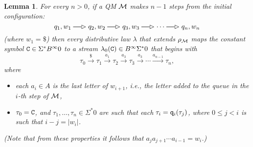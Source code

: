 \documentclass[adraft,copyright,creativecommons]{eptcs}
\newtheorem{lemma}[theorem]{Lemma}
\newcommand{\Bb}{B^{\infty}}
\newcommand{\Ss}{\Sigma^*}
\newcommand{\goes}[1]{\stackrel{#1}{\longrightarrow}}
\newcommand{\abstractgoes}[2]{\setbox0=\hbox{\ ${\scriptstyle#2}$\ }
\ifdim\wd0<12pt\wd0=12pt\fi
\mathrel{\stackrel{#2}{\rule[2.2pt]{\wd0}{0.6pt}}\mkern-6mu{#1}}}
\newcommand{\mqmgoes}[1]{\abstractgoes{\rhd}{#1}}
\begin{document}
\begin{lemma}\label{lem:owefnw}\rm
For every $n>0$, if a QM ${\cal M}$ makes $n-1$ steps from the initial configuration:
\[
	q_1,w_1 \mqmgoes{} q_2,w_2 \mqmgoes{} q_3,w_3 \mqmgoes{}\cdots\mqmgoes{}q_n,w_n
\]
(where $w_1=\$$) then every distributive law $\lambda$ that extends $\rho_{\cal M}$ maps the constant symbol ${\tt C}\in \Ss\Bb0$ to a stream $\lambda_0({\tt C})\in\Bb\Ss0$ that begins with
\[
	\tau_0\goes{\$}\tau_1\goes{a_1}\tau_2\goes{a_3}\tau_3\goes{a_3}\cdots\goes{a_{n-1}}\tau_n,
\]
where 
\begin{itemize}
\item each $a_i\in A$ is the last letter of $w_{i+1}$, i.e., the letter added to the queue in the $i$-th step of ${\cal M}$,
\item $\tau_0={\tt C}$, and $\tau_1,\ldots,\tau_n\in\Ss0$ are such that each $\tau_i={\tt q}_i(\tau_j)$, where $0\leq j<i$ is such that $i-j=|w_i|$.
\end{itemize}
(Note that from these properties it follows that $a_ja_{j+1}\cdots{a_{i-1}}=w_i$.)
\end{lemma}
\end{document}
